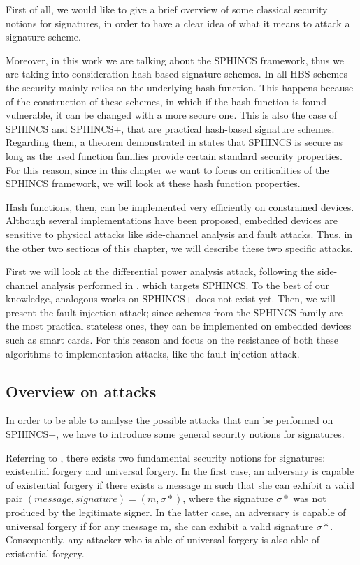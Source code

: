 \documentclass[a4paper,12pt]{article}
\begin{document}
First of all, we would like to give a brief overview of some classical security notions for signatures, in order to have a clear idea of what it means to attack a signature scheme.

Moreover, in this work we are talking about the SPHINCS framework, thus we are taking into consideration hash-based signature schemes.
In all HBS schemes the security mainly relies on the underlying hash function. This happens because of the construction of these schemes, in which if the hash function is found vulnerable, it can be changed with a more secure one. This is also the case of SPHINCS and SPHINCS+, that are practical hash-based signature schemes. Regarding them, a theorem demonstrated in \cite{1_sphincspaper} states that SPHINCS is secure as long as the used function families provide certain standard security properties. For this reason, since in this chapter we want to focus on criticalities of the SPHINCS framework, we will look at these hash function properties.

Hash functions, then, can be implemented very efficiently on constrained devices. Although several implementations have been proposed, embedded devices are sensitive to physical attacks like side-channel analysis and fault attacks. Thus, in the other two sections of this chapter, we will describe these two specific attacks. 

First we will look at the differential power analysis attack, following the side-channel analysis performed in \cite{11_poweranalysis}, which targets SPHINCS. To the best of our knowledge, analogous works on SPHINCS+ does not exist yet.
Then, we will present the fault injection attack; since schemes from the SPHINCS family are the most practical stateless ones, they can be implemented on embedded devices such as smart cards. For this reason \cite{12_faultinjection} and \cite{13_faultattacks} focus on the resistance of both these algorithms to implementation attacks, like the fault injection attack.

\subsection{Overview on attacks}
In order to be able to analyse the possible attacks that can be performed on SPHINCS+, we have to introduce some general security notions for signatures.

Referring to \cite{52_SecuritySign}, there exists two fundamental security notions for signatures: existential forgery and universal forgery. In the first case, an adversary is capable of existential forgery if there exists a message m such that she can exhibit a valid pair $(message, signature)=(m, \sigma*)$, where the signature $\sigma*$ was not produced by the legitimate signer.
In the latter case, an adversary is capable of universal forgery if for any message m, she can exhibit a valid signature $\sigma*$. Consequently, any attacker who is able of universal forgery is also able of existential forgery.
\end{document}

